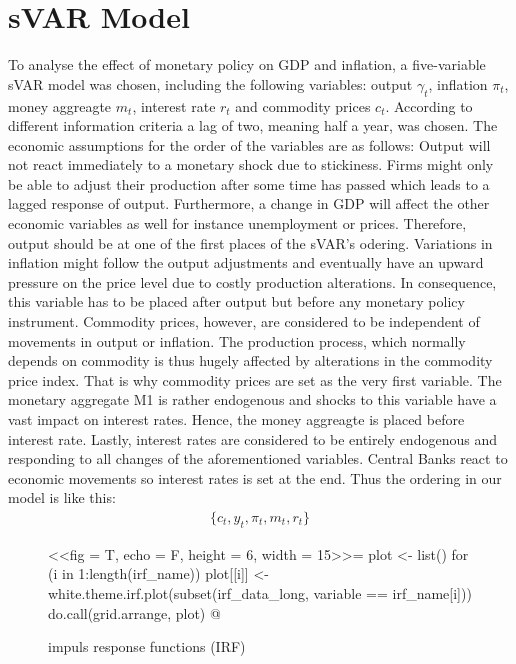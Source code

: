 \documentclass[11pt,a4paper]{report}
\begin{document}
\section{sVAR Model}
To analyse the effect of monetary policy on GDP and inflation, a five-variable sVAR model was chosen, including the following variables: output $\gamma_t$, inflation $\pi_t$, money aggreagte $m_t$, interest rate $r_t$ and commodity prices $c_t$. According to different information criteria a lag of two, meaning half a year, was chosen.
\newline
The economic assumptions for the order of the variables are as follows: Output will not react immediately to a monetary shock due to stickiness. Firms might only be able to adjust their production after some time has passed which leads to a lagged response of output. Furthermore, a change in GDP will affect the other economic variables as well for instance unemployment or prices. Therefore, output should be at one of the first places of the sVAR's odering. Variations in inflation might follow the output adjustments and eventually have an upward pressure on the price level due to costly production alterations. In consequence, this variable has to be placed after output but before any monetary policy instrument.
\newline
Commodity prices, however, are considered to be independent of movements in output or inflation. The  production  process,  which  normally  depends  on  commodity  is  thus  hugely  affected by alterations in the commodity price index. That is why commodity prices are set as the very first variable.
\newline
The monetary aggregate M1 is rather endogenous and shocks to this variable have a vast impact on interest rates. Hence, the money aggreagte is placed before interest rate. Lastly, interest rates are considered to be entirely endogenous and responding to all changes of the aforementioned variables. Central Banks react to economic movements so interest rates is set at the end.
\noindent Thus the ordering in our model is like this:
	\begin{eqnarray*}
		\{c_t, y_t, \pi_t, m_t, r_t \}
	\end{eqnarray*}




\begin{figure}[H]
\caption{impuls response functions (IRF)}
\label{irf}
\centering
<<fig = T, echo = F, height = 6, width = 15>>=
plot <- list()
for (i in 1:length(irf_name)){
plot[[i]] <- white.theme.irf.plot(subset(irf_data_long, variable == irf_name[i]))
}
do.call(grid.arrange, plot)
@
\end{figure}
\end{document}
